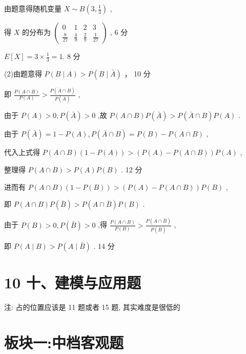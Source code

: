 \documentclass[10pt]{article}
\begin{document}
由题意得随机变量 \(X \sim  B\left( {3,\frac{1}{3}}\right)\) ,

得 \(X\) 的分布为 \(\left( \begin{matrix} 0 & 1 & 2 & 3 \\  \frac{8}{27} & \frac{4}{9} & \frac{2}{9} & \frac{1}{27} \end{matrix}\right)\) , 6 分

\(E\left\lbrack  X\right\rbrack   = 3 \times  \frac{1}{3} = 1.\) 8 分

(2)由题意得 \(P\left( {B \mid  A}\right)  > P\left( {B \mid  \bar{A}}\right)\) ， 10 分

即 \(\frac{P\left( {A \cap  B}\right) }{P\left( A\right) } > \frac{P\left( {\bar{A} \cap  B}\right) }{P\left( \bar{A}\right) }\) ,

由于 \(P\left( A\right)  > 0,P\left( \bar{A}\right)  > 0\) ,故 \(P\left( {A \cap  B}\right) P\left( \bar{A}\right)  > P\left( {\bar{A} \cap  B}\right) P\left( A\right)\) .

由于 \(P\left( \bar{A}\right)  = 1 - P\left( A\right) ,P\left( {\bar{A} \cap  B}\right)  = P\left( B\right)  - P\left( {A \cap  B}\right)\) ,

代入上式得 \(P\left( {A \cap  B}\right) \left( {1 - P\left( A\right) }\right)  > \left( {P\left( A\right)  - P\left( {A \cap  B}\right) }\right) P\left( A\right)\) ,

整理得 \(P\left( {A \cap  B}\right)  > P\left( A\right) P\left( B\right)\) . 12 分

进而有 \(P\left( {A \cap  B}\right) \left( {1 - P\left( B\right) }\right)  > \left( {P\left( A\right)  - P\left( {A \cap  B}\right) }\right) P\left( B\right)\) ,

即 \(P\left( {A \cap  B}\right) P\left( \bar{B}\right)  > P\left( {A \cap  \bar{B}}\right) P\left( B\right)\) .

由于 \(P\left( B\right)  > 0,P\left( \bar{B}\right)  > 0\) ,得 \(\frac{P\left( {A \cap  B}\right) }{P\left( B\right) } > \frac{P\left( {A \cap  \bar{B}}\right) }{P\left( \bar{B}\right) }\) ,

即 \(P\left( {A \mid  B}\right)  > P\left( {A \mid  \bar{B}}\right)\) . 14 分

\section*{10 十、建模与应用题}

注: 占的位置应该是 11 题或者 15 题, 其实难度是很低的

\section*{板块一:中档客观题}
\end{document}
